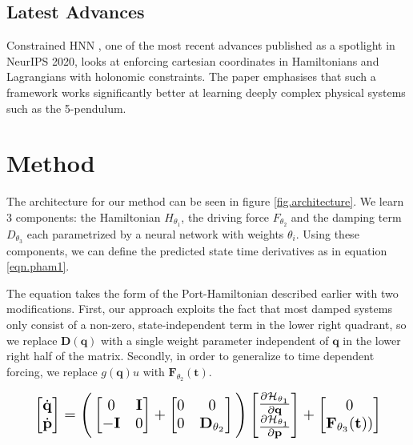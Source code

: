 \documentclass[twoside]{article}
\begin{document}
\subsection{Latest Advances}
Constrained HNN \cite{finzi_generalizing_2020}, one of the most recent advances published as a spotlight in NeurIPS 2020, looks at enforcing cartesian coordinates in Hamiltonians and Lagrangians with holonomic constraints. The paper emphasises that such a framework works significantly better at learning deeply complex physical systems such as the 5-pendulum. 


\section{Method}

The architecture for our method can be seen in figure \ref{fig.architecture}. We learn 3 components: the Hamiltonian $H_{\theta_1}$, the driving force $F_{\theta_2}$ and the damping term $D_{\theta_3}$ each parametrized by a neural network with weights $\theta_i$. Using these components, we can define the predicted state time derivatives as in equation \ref{eqn.pham1}.

The equation takes the form of the Port-Hamiltonian described earlier with two modifications. First, our approach exploits the fact that most damped systems only consist of a non-zero, state-independent term in the lower right quadrant, so we replace $\mathbf{D}(\mathbf{q})$ with a single weight parameter independent of $\mathbf{q}$ in the lower right half of the matrix. Secondly, in order to generalize to time dependent forcing, we replace $g(\mathbf{q})u$ with $\mathbf{F}_{\theta_2}(\mathbf{t})$.

\begin{equation}
\resizebox{0.9\linewidth}{!}{$%
\begin{bmatrix}
\dot{\mathbf{q}} \\
\dot{\mathbf{p}}
\end{bmatrix}
=
\Bigg(\begin{bmatrix}
0 & \mathbf{I} \\
-\mathbf{I} & 0
\end{bmatrix} +
\begin{bmatrix}
0 & 0 \\
0 & \mathbf{D}_{\theta_2}
\end{bmatrix}
 \Bigg)
 \begin{bmatrix}
\frac{\partial \mathcal{H}_{\theta_1}}{\partial \mathbf{q}} \\
\frac{\partial \mathcal{H}_{\theta_1}}{\partial \mathbf{p}}
\end{bmatrix}
+
\begin{bmatrix}
0 \\
\mathbf{F}_{\theta_3}(\mathbf{t}))
\end{bmatrix}
$%
}%
\label{eqn.pham1}
\end{equation}
\end{document}
